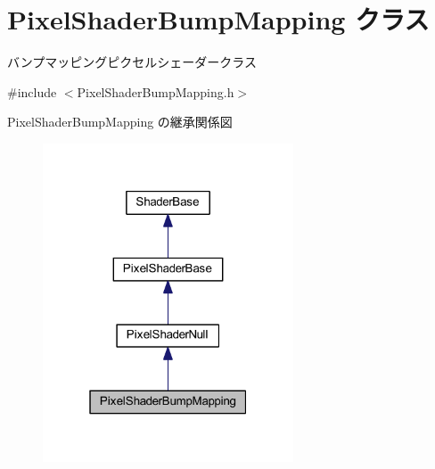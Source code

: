 \hypertarget{class_pixel_shader_bump_mapping}{}\section{Pixel\+Shader\+Bump\+Mapping クラス}
\label{class_pixel_shader_bump_mapping}


バンプマッピングピクセルシェーダークラス  




{\ttfamily \#include $<$Pixel\+Shader\+Bump\+Mapping.\+h$>$}



Pixel\+Shader\+Bump\+Mapping の継承関係図\nopagebreak
\begin{figure}[H]
\begin{center}
\leavevmode
\includegraphics[width=211pt]{class_pixel_shader_bump_mapping__inherit__graph}
\end{center}
\end{figure}
